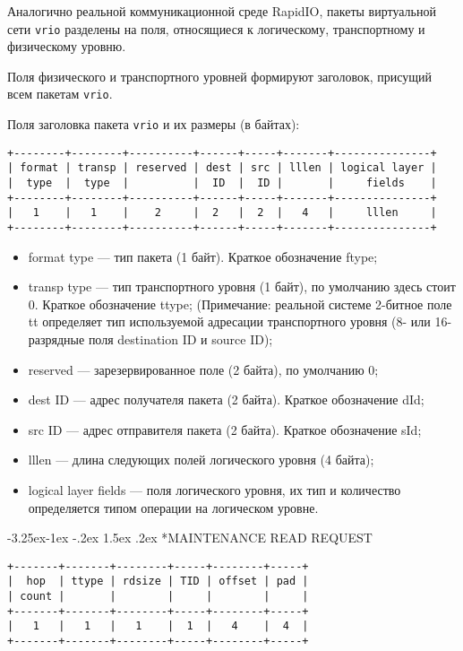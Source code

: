 \documentclass[14pt,a4paper,oneside]{report}
\makeatletter
\renewcommand\subsection{\@startsection{subsection}{2}{\z@}%
                                     {-3.25ex\@plus -1ex \@minus -.2ex}%
                                     {1.5ex \@plus .2ex}%
                                     {\normalfont\normalsize}}
\newcommand{\vrio}{\texttt{vrio}\xspace}
\makeatother
\begin{document}
Аналогично реальной коммуникационной среде RapidIO, пакеты виртуальной
сети \vrio разделены на поля, относящиеся к логическому,
транспортному и физическому уровню.

Поля физического и транспортного уровней формируют заголовок,
присущий всем пакетам \vrio.

Поля заголовка пакета \vrio и их размеры (в байтах):

\begin{verbatim}
+--------+--------+----------+------+-----+-------+---------------+
| format | transp | reserved | dest | src | lllen | logical layer |
|  type  |  type  |          |  ID  |  ID |       |     fields    |
+--------+--------+----------+------+-----+-------+---------------+
|   1    |   1    |    2     |  2   |  2  |   4   |     lllen     |
+--------+--------+----------+------+-----+-------+---------------+
\end{verbatim}

\begin{itemize}
\item format type --- тип пакета (1 байт). Краткое обозначение ftype;
\item transp type --- тип транспортного уровня (1 байт), по умолчанию здесь стоит 0. Краткое обозначение ttype; (Примечание: реальной системе 2-битное поле tt определяет тип используемой
адресации транспортного уровня (8- или 16-разрядные поля destination ID и source ID);
\item reserved --- зарезервированное поле (2 байта), по умолчанию 0;
\item dest ID --- адрес получателя пакета (2 байта). Краткое обозначение dId;
\item src ID --- адрес отправителя пакета (2 байта). Краткое обозначение sId;
\item lllen --- длина следующих полей логического уровня (4 байта);
\item logical layer fields --- поля логического уровня, их тип и количество
определяется типом операции на логическом уровне.
\end{itemize}

\eject

\subsection*{MAINTENANCE READ REQUEST}

\begin{verbatim}
+-------+-------+--------+-----+--------+-----+
|  hop  | ttype | rdsize | TID | offset | pad |
| count |       |        |     |        |     |
+-------+-------+--------+-----+--------+-----+
|   1   |   1   |   1    |  1  |   4    |  4  |
+-------+-------+--------+-----+--------+-----+
\end{verbatim}
\end{document}
